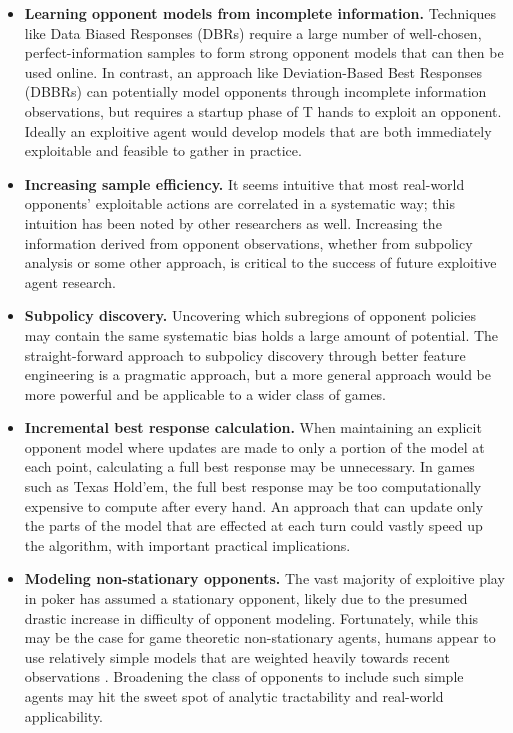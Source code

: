 \documentclass{aamas2013}
\begin{document}
\begin{itemize}
\item \textbf{Learning opponent models from incomplete information.} Techniques like Data Biased Responses (DBRs) \cite{dbr} require a large number of well-chosen, perfect-information samples to form strong opponent models that can then be used online. In contrast, an approach like Deviation-Based Best Responses (DBBRs) \cite{dbbr} can potentially model opponents through incomplete information observations, but requires a startup phase of T hands to exploit an opponent. Ideally an exploitive agent would develop models that are both immediately exploitable and feasible to gather in practice.

\item \textbf{Increasing sample efficiency.} It seems intuitive that most real-world opponents' exploitable actions are correlated in a systematic way; this intuition has been noted by other researchers \cite{shortterm} as well. Increasing the information derived from opponent observations, whether from subpolicy analysis or some other approach, is critical to the success of future exploitive agent research.

\item \textbf{Subpolicy discovery.} Uncovering which subregions of opponent policies may contain the same systematic bias holds a large amount of potential. The straight-forward approach to subpolicy discovery through better feature engineering is a pragmatic approach, but a more general approach would be more powerful and be applicable to a wider class of games.

\item \textbf{Incremental best response calculation.} When maintaining an explicit opponent model where updates are made to only a portion of the model at each point, calculating a full best response may be unnecessary. In games such as Texas Hold'em, the full best response may be too computationally expensive to compute after every hand. An approach that can update only the parts of the model that are effected at each turn could vastly speed up the algorithm, with important practical implications.

\item \textbf{Modeling non-stationary opponents.} The vast majority of exploitive play in poker has assumed a stationary opponent, likely due to the presumed drastic increase in difficulty of opponent modeling. Fortunately, while this may be the case for game theoretic non-stationary agents, humans appear to use relatively simple models that are weighted heavily towards recent observations \cite{simplemodels}. Broadening the class of opponents to include such simple agents may hit the sweet spot of analytic tractability and real-world applicability.


\end{itemize}
\end{document}
